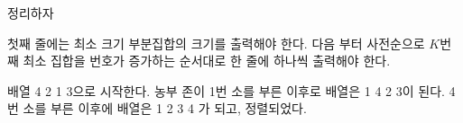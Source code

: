 \begin{problem}{정리하자}
	\OutputFile
	
	첫째 줄에는 최소 크기 부분집합의 크기를 출력해야 한다.
	다음 부터 사전순으로 $K$번째 최소 집합을 번호가 증가하는 순서대로 한 줄에 하나씩 출력해야 한다.

	\Constraints
		
	\begin{example}
	\end{example}
	
	\Notes

	배열 4 2 1 3으로 시작한다. 농부 존이 1번 소를 부른 이후로 배열은 1 4 2 3이 된다. 4번 소를 부른 이후에 배열은 1 2 3 4 가 되고, 정렬되었다.
	
	
\end{problem}

